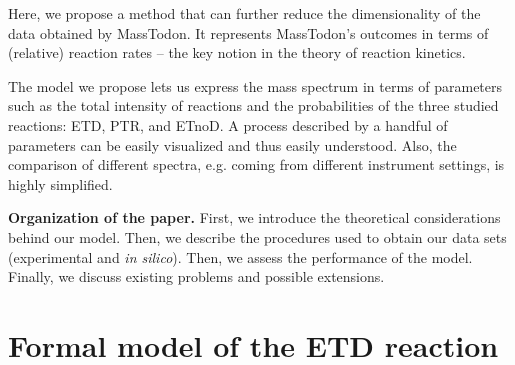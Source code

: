 \documentclass{llncs}
\begin{document}
Here, we propose a method that can further reduce the dimensionality of the data obtained by {\sc MassTodon}.
It represents {\sc MassTodon}'s outcomes in terms of (relative) reaction rates -- the key notion in the theory of reaction kinetics.

The model we propose lets us express the mass spectrum in terms of parameters such as the total intensity of reactions and the probabilities of the three studied reactions: ETD, PTR, and ETnoD. A process described by a handful of parameters can be easily visualized and thus easily understood. Also, the comparison of different spectra, e.g. coming from different instrument settings, is highly simplified.

\textbf{Organization of the paper.}
First, we introduce the theoretical considerations behind our model. Then, we describe the procedures used to obtain our data sets (experimental and \textit{in silico}). Then, we assess the performance of the model. Finally, we discuss existing problems and possible extensions.


\section{Formal model of the ETD reaction}
\end{document}
